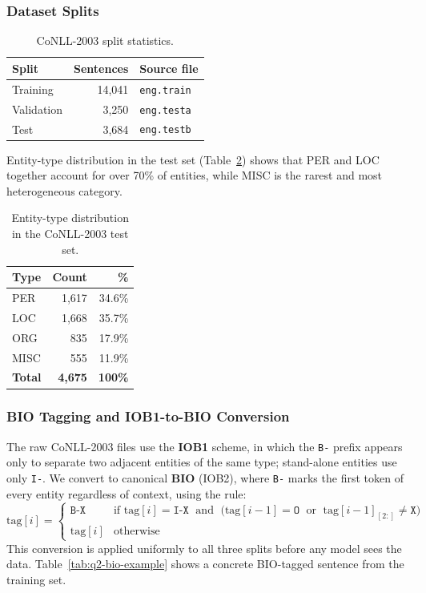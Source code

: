 \documentclass[11pt,a4paper]{article}
\begin{document}
\subsubsection{Dataset Splits}

\begin{table}[H]
\centering
\caption{CoNLL-2003 split statistics.}
\label{tab:q2-splits}
\begin{tabular}{lrl}
\toprule
\textbf{Split} & \textbf{Sentences} & \textbf{Source file} \\
\midrule
Training   & 14{,}041 & \texttt{eng.train} \\
Validation & 3{,}250  & \texttt{eng.testa} \\
Test       & 3{,}684  & \texttt{eng.testb} \\
\bottomrule
\end{tabular}
\end{table}

Entity-type distribution in the test set (Table~\ref{tab:q2-entity-dist})
shows that PER and LOC together account for over 70\% of entities, while MISC
is the rarest and most heterogeneous category.

\begin{table}[H]
\centering
\caption{Entity-type distribution in the CoNLL-2003 test set.}
\label{tab:q2-entity-dist}
\begin{tabular}{lrr}
\toprule
\textbf{Type} & \textbf{Count} & \textbf{\%} \\
\midrule
PER  & 1{,}617 & 34.6\% \\
LOC  & 1{,}668 & 35.7\% \\
ORG  & 835     & 17.9\% \\
MISC & 555     & 11.9\% \\
\midrule
\textbf{Total} & \textbf{4{,}675} & \textbf{100\%} \\
\bottomrule
\end{tabular}
\end{table}

\subsubsection{BIO Tagging and IOB1-to-BIO Conversion}

The raw CoNLL-2003 files use the \textbf{IOB1} scheme, in which the \texttt{B-}
prefix appears only to separate two adjacent entities of the same type;
stand-alone entities use only \texttt{I-}. We convert to canonical \textbf{BIO}
(IOB2), where \texttt{B-} marks the first token of every entity regardless of
context, using the rule:
\[
\text{tag}[i] =
\begin{cases}
\texttt{B-X} & \text{if } \text{tag}[i] = \texttt{I-X} \;\text{ and }\;
               \bigl(\text{tag}[i{-}1] = \texttt{O} \;\text{ or }\;
               \text{tag}[i{-}1]_{[2:]} \neq \texttt{X}\bigr) \\
\text{tag}[i] & \text{otherwise}
\end{cases}
\]
This conversion is applied uniformly to all three splits before any model sees
the data. Table~\ref{tab:q2-bio-example} shows a concrete BIO-tagged sentence
from the training set.
\end{document}

